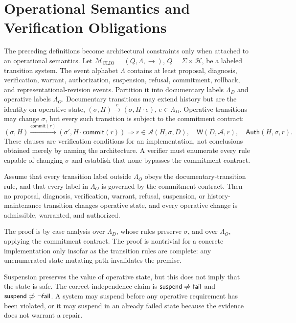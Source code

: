\section{Operational Semantics and Verification Obligations}

The preceding definitions become architectural constraints only when attached to an operational semantics. Let $\mathcal{M}_{\mathrm{CLIO}} = (Q,\Lambda,\rightarrow)$, $Q = \Sigma \times \mathcal{H}$, be a labeled transition system. The event alphabet $\Lambda$ contains at least proposal, diagnosis, verification, warrant, authorization, suspension, refusal, commitment, rollback, and representational-revision events. Partition it into documentary labels $\Lambda_D$ and operative labels $\Lambda_O$. Documentary transitions may extend history but are the identity on operative state, $(\sigma,H) \xrightarrow{e} (\sigma, H \cdot e)$, $e \in \Lambda_D$. Operative transitions may change $\sigma$, but every such transition is subject to the commitment contract:
\[
(\sigma,H) \xrightarrow{\mathsf{commit}(r)} (\sigma', H \cdot \mathsf{commit}(r)) \Longrightarrow r \in \mathcal{A}(H,\sigma,D), \quad \mathsf{W}(D,\mathcal{A},r), \quad \mathsf{Auth}(H,\sigma,r).
\]
These clauses are verification conditions for an implementation, not conclusions obtained merely by naming the architecture. A verifier must enumerate every rule capable of changing $\sigma$ and establish that none bypasses the commitment contract.

\begin{proposition}
Assume that every transition label outside $\Lambda_O$ obeys the documentary-transition rule, and that every label in $\Lambda_O$ is governed by the commitment contract. Then no proposal, diagnosis, verification, warrant, refusal, suspension, or history-maintenance transition changes operative state, and every operative change is admissible, warranted, and authorized.
\end{proposition}

The proof is by case analysis over $\Lambda_D$, whose rules preserve $\sigma$, and over $\Lambda_O$, applying the commitment contract. The proof is nontrivial for a concrete implementation only insofar as the transition rules are complete: any unenumerated state-mutating path invalidates the premise.

Suspension preserves the value of operative state, but this does not imply that the state is safe. The correct independence claim is $\mathsf{suspend} \centernot\Rightarrow \mathsf{fail}$ and $\mathsf{suspend} \centernot\Rightarrow \neg\mathsf{fail}$. A system may suspend before any operative requirement has been violated, or it may suspend in an already failed state because the evidence does not warrant a repair.

